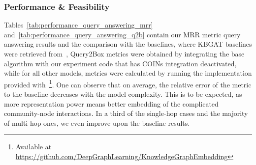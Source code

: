 \subsubsection{Performance \& Feasibility}

Tables~\ref{tab:performance_query_answering_mrr} and~\ref{tab:performance_query_answering_q2b} contain our MRR metric query answering results and the comparison with the baselines, where KBGAT baselines were retrieved from~\cite{nathani_learning_2019}, Query2Box metrics were obtained by integrating the base algorithm with our experiment code that has COINs integration deactivated, while for all other models, metrics were calculated by running the implementation provided with~\cite{sun_rotate_2019}\footnote{Available at \url{https://github.com/DeepGraphLearning/KnowledgeGraphEmbedding}}. 
One can observe that on average, the relative error of the metric to the baseline decreases with the model complexity. This is to be expected, as more representation power means better embedding of the complicated community-node interactions. In a third of the single-hop cases and the majority of multi-hop ones, we even improve upon the baseline results.

